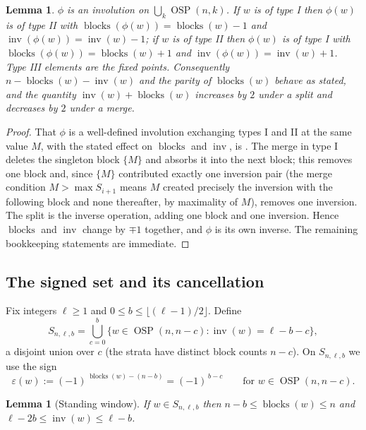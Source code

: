 \documentclass[11pt]{amsart}
\newtheorem{lemma}[theorem]{Lemma}
\theoremstyle{definition}
\DeclareMathOperator{\OSP}{OSP}
\DeclareMathOperator{\inv}{inv}
\DeclareMathOperator{\blocks}{blocks}
\begin{document}
\begin{lemma}\label{lem:phi-props}
$\phi$ is an involution on $\bigcup_{k}\OSP(n,k)$. If $w$ is of type I then
$\phi(w)$ is of type II with $\blocks(\phi(w))=\blocks(w)-1$ and
$\inv(\phi(w))=\inv(w)-1$; if $w$ is of type II then $\phi(w)$ is of type I with
$\blocks(\phi(w))=\blocks(w)+1$ and $\inv(\phi(w))=\inv(w)+1$. Type III elements
are the fixed points. Consequently $n-\blocks(w)-\inv(w)$ and the parity of
$\blocks(w)$ behave as stated, and the quantity $\inv(w)+\blocks(w)$ increases by
$2$ under a split and decreases by $2$ under a merge.
\end{lemma}

\begin{proof}
That $\phi$ is a well-defined involution exchanging types I and II at the same
value $M$, with the stated effect on $\blocks$ and $\inv$, is
\cite[Section 5.1]{SaganSwanson2024}. The merge in type I deletes the singleton
block $\{M\}$ and absorbs it into the next block; this removes one block and,
since $\{M\}$ contributed exactly one inversion pair (the merge condition
$M>\max S_{i+1}$ means $M$ created precisely the inversion with the following
block and none thereafter, by maximality of $M$), removes one inversion. The
split is the inverse operation, adding one block and one inversion. Hence
$\blocks$ and $\inv$ change by $\mp1$ together, and $\phi$ is its own inverse. The
remaining bookkeeping statements are immediate.
\end{proof}

\subsection{The signed set and its cancellation}
Fix integers $\ell\ge1$ and $0\le b\le\lfloor(\ell-1)/2\rfloor$. Define
\begin{equation}\label{eq:Sdef}
S_{n,\ell,b}=\bigcup_{c=0}^b \{w\in\OSP(n,n-c):\inv(w)=\ell-b-c\},
\end{equation}
a disjoint union over $c$ (the strata have distinct block counts $n-c$). On
$S_{n,\ell,b}$ we use the sign
\begin{equation}\label{eq:epsdef}
\varepsilon(w):=(-1)^{\,\blocks(w)-(n-b)}=(-1)^{\,b-c}\qquad
\text{for }w\in\OSP(n,n-c).
\end{equation}

\begin{lemma}[Standing window]\label{lem:window}
If $w\in S_{n,\ell,b}$ then $n-b\le\blocks(w)\le n$ and
$\ell-2b\le\inv(w)\le\ell-b$.
\end{lemma}
\end{document}
